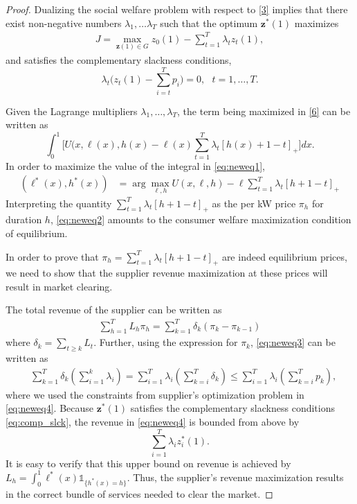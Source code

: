 \documentclass[10pt,draftcls,onecolumn]{IEEEtran}
\let \VEC \mathbf
\let \vec \mathbf
\def\ind{{\mathds{1}}}
\newcounter{l1}
\newcounter{l2}
\newcounter{l3}
\begin{document}
\begin{proof}
Dualizing the social welfare problem with respect to \eqref{3} implies that there 
exist non-negative numbers $\lambda_1, \ldots \lambda_T$ such that the optimum $\VEC z^*(1)$ maximizes
\begin{eqnarray}
J= \max_{\VEC z(1) \in G}  z_0 (1) - \sum_{t=1}^T \lambda_t z_t(1) ,\label{6}
\end{eqnarray}
and satisfies the complementary slackness conditions,
\begin{equation}
\lambda_t\Big(z_t(1) - \sum_{i=t}^T p_i\Big) = 0, ~~~t=1,\ldots,T .\label{eq:comp_slck}
\end{equation}

Given the Lagrange multipliers $\lambda_1,\ldots,\lambda_T$, the term being maximized in \eqref{6} can be written as
\begin{equation}
\int_0^1 \Big[ U(x,\ell(x),h(x) - \ell(x)\sum_{t=1}^T\lambda_t[h(x)+1-t]_+ \Big] dx .\label{eq:neweq1}
\end{equation}
In order to maximize the value of the integral in \eqref{eq:neweq1}, 
\begin{align}
(\ell^*(x),h^*(x)) &= \arg\max_{\ell,h} U(x,\ell,h) -
\ell\sum_{t=1}^T\lambda_t[h+1-t]_+ \label{eq:neweq2}
\end{align}
Interpreting the quantity $\sum_{t=1}^T\lambda_t[h+1-t]_+$ as the per kW price $\pi_h$ for duration $h$,  \eqref{eq:neweq2} amounts to the consumer welfare maximization condition of equilibrium. 

In order to prove that $\pi_h = \sum_{t=1}^T\lambda_t[h+1-t]_+ $ are indeed equilibrium prices, we need to show that the supplier revenue maximization at these prices will result in market clearing. 

The total revenue of the supplier can be written as 
\begin{align}
\sum_{h=1}^T L_h\pi_h = \sum_{k=1}^T \delta_k(\pi_k -\pi_{k-1}) \label{eq:neweq3}
\end{align}
where $\delta_k = \sum_{t \geq k} L_t$. Further,  using the expression for $\pi_k$, \eqref{eq:neweq3} can be written as
\begin{align}
&\sum_{k=1}^T \delta_k \left(\sum_{i=1}^k \lambda_i\right)
= \sum_{i=1}^T \lambda_i \left(\sum_{k=i}^T \delta_k\right) 
\leq \sum_{i=1}^T \lambda_i \left(\sum_{k=i}^T p_k\right),\label{eq:neweq4}
\end{align}
where we used the constraints from supplier's optimization problem in \eqref{eq:neweq4}. Because $\vec z^*(1)$ satisfies the complementary slackness conditions  \eqref{eq:comp_slck}, the revenue in \eqref{eq:neweq4} is bounded from above by
\[ \sum_{i=1}^T \lambda_i z^*_i(1).\]
It is easy to verify that this upper bound on revenue is achieved by  $L_h = \int_0^1 \ell^*(x)\ind_{\{h^*(x) = h\}}$. Thus, the supplier's revenue maximization results in the correct bundle of  services needed to clear the market. 
\end{proof}
\end{document}
